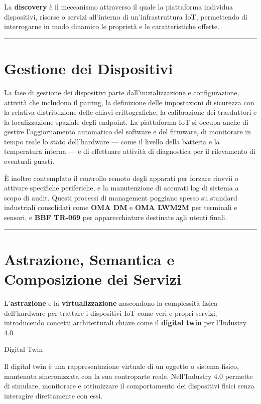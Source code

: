 \documentclass[
  italian,
  openany]{book}
\begin{document}
La \textbf{discovery} è il meccanismo attraverso il quale la piattaforma
individua dispositivi, risorse o servizi all'interno di
un'infrastruttura IoT, permettendo di interrogarne in modo dinamico le
proprietà e le caratteristiche offerte.

\begin{center}\rule{0.5\linewidth}{0.5pt}\end{center}

\section{Gestione dei Dispositivi}\label{gestione-dei-dispositivi}

La fase di gestione dei dispositivi parte dall'inizializzazione e
configurazione, attività che includono il pairing, la definizione delle
impostazioni di sicurezza con la relativa distribuzione delle chiavi
crittografiche, la calibrazione dei trasduttori e la localizzazione
spaziale degli endpoint. La piattaforma IoT si occupa anche di gestire
l'aggiornamento automatico del software e del firmware, di monitorare in
tempo reale lo stato dell'hardware --- come il livello della batteria e
la temperatura interna --- e di effettuare attività di diagnostica per
il rilevamento di eventuali guasti.

È inoltre contemplato il controllo remoto degli apparati per forzare
riavvii o attivare specifiche periferiche, e la manutenzione di accurati
log di sistema a scopo di audit. Questi processi di management poggiano
spesso su standard industriali consolidati come \textbf{OMA DM} e
\textbf{OMA LWM2M} per terminali e sensori, e \textbf{BBF TR-069} per
apparecchiature destinate agli utenti finali.

\begin{center}\rule{0.5\linewidth}{0.5pt}\end{center}

\section{Astrazione, Semantica e Composizione dei
Servizi}\label{astrazione-semantica-e-composizione-dei-servizi}

L'\textbf{astrazione} e la \textbf{virtualizzazione} nascondono la
complessità fisica dell'hardware per trattare i dispositivi IoT come
veri e propri servizi, introducendo concetti architetturali chiave come
il \textbf{digital twin} per l'Industry 4.0.

\begin{calloutdefinition}{Digital Twin}

Il digital twin è una rappresentazione virtuale di un oggetto o sistema
fisico, mantenuta sincronizzata con la sua controparte reale.
Nell'Industry 4.0 permette di simulare, monitorare e ottimizzare il
comportamento dei dispositivi fisici senza interagire direttamente con
essi.

\end{calloutdefinition}
\end{document}
